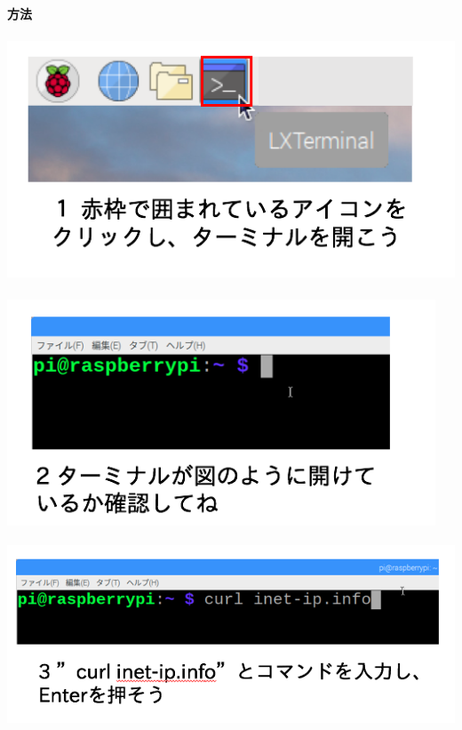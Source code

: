 \documentclass[a4paper,12pt,dvipdfmx]{jarticle}
\begin{document}
\bigskip

{\bfseries
	方法}



\centering
\includegraphics[width=13.942cm,height=7.366cm]{ome7-img007.png}

\centering
\includegraphics[width=12.746cm,height=6.742cm]{ome7-img008.png}
\flushleft


\bigskip


\bigskip


\bigskip


\bigskip



\centering
\includegraphics[width=13.716cm,height=5.459cm]{ome7-img018.png}
\end{document}

